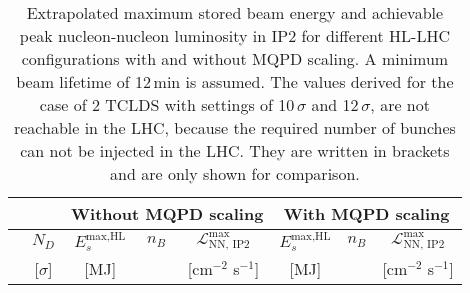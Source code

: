 \begin{table}[t]
\centering

\caption{Extrapolated maximum stored beam energy and achievable peak nucleon-nucleon luminosity in IP2 for different HL-LHC configurations with and without MQPD scaling. A minimum beam lifetime of 12\,min is assumed.%
  The values derived for the case of 2 TCLDS with settings of 10$\,\sigma$ and 12$\,\sigma$, are not reachable in the LHC, because the required number of bunches can not be injected in the LHC. They are written in brackets and are only shown for comparison.}
\label{tab:esmax}
\footnotesize
\begin{tabular}{lc|ccc|ccc}
       \multicolumn{2}{c}{} & \multicolumn{3}{c}{Without MQPD scaling} & \multicolumn{3}{c}{With MQPD scaling} \\  \toprule

            & $N_D$                & $E_s^\text{max,HL}$       & $n_B$ & $\mathcal{L}_{\text{NN, IP2}}^\text{max}$                      & $E_s^\text{max,HL}$   & $n_B$        & $\mathcal{L}_{\text{NN, IP2}}^\text{max}$                           \\ 
            & {[}$\sigma${]}       & {[}MJ{]}                 &      &          [cm$^{-2}$ s$^{-1}$] &                     {[}MJ{]} &         &                               [cm$^{-2}$ s$^{-1}$]     \\ \midrule


\end{tabular}
\end{table}
